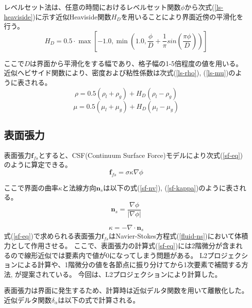 レベルセット法は、任意の時間におけるレベルセット関数$\phi$から次式(\ref{ls-heaviside})に示す近似Heaviside関数$H_{D}$を用いることにより界面近傍の平滑化を行う。
\begin{equation}
\label{ls-heaviside}
	H_{D} = 0.5 \cdot \max \left[-1.0, \min \left(1.0, \frac{\phi}{D} + \frac{1}{\pi} sin\left(\frac{\pi \phi}{D}\right)\right) \right]
\end{equation}

ここで$D$は界面から平滑化をする幅であり、格子幅の1-5倍程度の値を用いる。
近似ヘビサイド関数により、密度および粘性係数は次式(\ref{ls-rho}), (\ref{ls-mu})のように表される。
\begin{equation}
\label{ls-rho}
	\rho = 0.5 (\rho_l + \rho_g) + H_{D} (\rho_l - \rho_g)
\end{equation}
\begin{equation}
\label{ls-mu}
	\mu = 0.5 (\mu_l + \mu_g) + H_{D} (\mu_l - \mu_g)
\end{equation}


\subsection{表面張力}
表面張力$\bm{f}_{fs}$とすると、CSF(Continuum Surface Force)モデルにより次式(\ref{sf-eq})のように算定できる。
\begin{equation}
\label{sf-eq}
	\bm{f}_{fs} = \sigma \kappa \nabla \phi
\end{equation}

ここで界面の曲率$\kappa$と法線方向$\bm{n}_{s}$は以下の式(\ref{sf-nv}), (\ref{sf-kappa})のように表される。
\begin{equation}
\label{sf-nv}
	\bm{n}_{s} = \frac{\nabla \phi}{| \nabla \phi |}
\end{equation}

\begin{equation}
\label{sf-kappa}
	\kappa = - \nabla \cdot \bm{n}_{s}
\end{equation}
式(\ref{sf-eq})で求められる表面張力$\bm{f}_{fs}$はNavier-Stokes方程式(\ref{fluid-ns})において体積力として作用させる。
ここで、表面張力の計算式(\ref{sf-eq})には2階微分が含まれるので線形近似では要素内で値が0になってしまう問題がある。
L2プロジェクションによる計算\cite{Nagrath2003}や、1階微分の値を各節点に振り分けてから1次要素で補間する方法\cite{Matsumoto2006}, \cite{Shi2019}が提案されている。
今回は、L2プロジェクションにより計算した。

表面張力は界面に発生するため、計算時は近似デルタ関数を用いて離散化した。
近似デルタ関数$\delta_{\alpha}$は以下の式で計算される。

